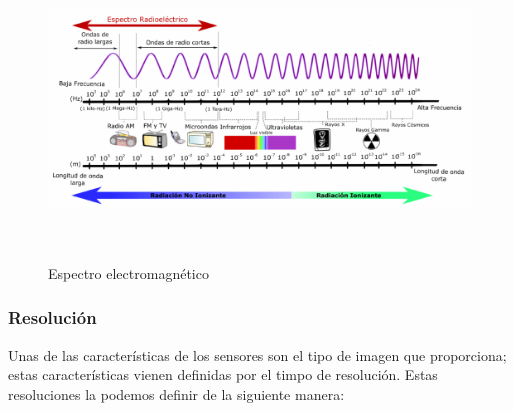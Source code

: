 \begin{figure}[H] \centering
  \includegraphics[height=8cm,keepaspectratio=true,clip=true]{imagenes/MarcoTeorico/espectro-electro.png}
  \caption{Espectro electromagnético \citep{https://iie.fing.edu.uy/proyectos/esopo/eem/}}\label{Fig:espectro-electromagnetico}
\end{figure}


\subsubsection{Resolución}
Unas de las características de los sensores son el tipo de imagen que proporciona; estas características vienen definidas por el timpo de resolución. Estas resoluciones la podemos definir de la siguiente manera:

